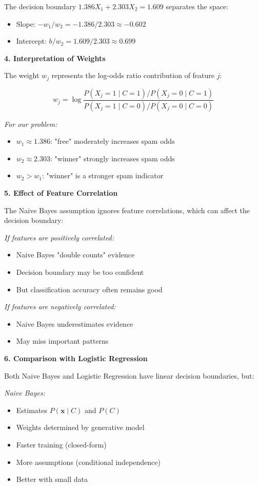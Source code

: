 \documentclass[12pt]{article}
\begin{document}
\begin{explanation}
The decision boundary $1.386 X_1 + 2.303 X_2 = 1.609$ separates the space:
\begin{itemize}
    \item Slope: $-w_1/w_2 = -1.386/2.303 \approx -0.602$
    \item Intercept: $b/w_2 = 1.609/2.303 \approx 0.699$
\end{itemize}

\textbf{4. Interpretation of Weights}

The weight $w_j$ represents the log-odds ratio contribution of feature $j$:

\[
w_j = \log \frac{P(X_j = 1 \mid C = 1) / P(X_j = 0 \mid C = 1)}{P(X_j = 1 \mid C = 0) / P(X_j = 0 \mid C = 0)}
\]

\textit{For our problem:}
\begin{itemize}
    \item $w_1 \approx 1.386$: "free" moderately increases spam odds
    \item $w_2 \approx 2.303$: "winner" strongly increases spam odds
    \item $w_2 > w_1$: "winner" is a stronger spam indicator
\end{itemize}

\textbf{5. Effect of Feature Correlation}

The Naive Bayes assumption ignores feature correlations, which can affect the decision boundary:

\textit{If features are positively correlated:}
\begin{itemize}
    \item Naive Bayes "double counts" evidence
    \item Decision boundary may be too confident
    \item But classification accuracy often remains good
\end{itemize}

\textit{If features are negatively correlated:}
\begin{itemize}
    \item Naive Bayes underestimates evidence
    \item May miss important patterns
\end{itemize}

\textbf{6. Comparison with Logistic Regression}

Both Naive Bayes and Logistic Regression have linear decision boundaries, but:

\textit{Naive Bayes:}
\begin{itemize}
    \item Estimates $P(\mathbf{x} \mid C)$ and $P(C)$
    \item Weights determined by generative model
    \item Faster training (closed-form)
    \item More assumptions (conditional independence)
    \item Better with small data
\end{itemize}


\end{explanation}
\end{document}
